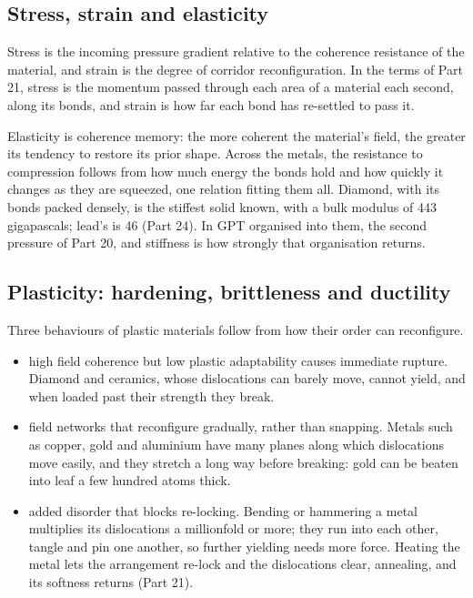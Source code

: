 \subsection{Stress, strain and elasticity}

 Stress is the incoming pressure gradient relative to the coherence resistance of the material, and strain is the degree of corridor reconfiguration. In the terms of Part 21, stress is the momentum passed through each area of a material each second, along its bonds, and strain is how far each bond has re-settled to pass it.

Elasticity is coherence memory: the more coherent the material's field, the greater its tendency to restore its prior shape.  Across the metals, the resistance to compression follows from how much energy the bonds hold and how quickly it changes as they are squeezed, one relation fitting them all. Diamond, with its bonds packed densely, is the stiffest solid known, with a bulk modulus of 443 gigapascals; lead's is 46 (Part 24). In GPT  organised into them, the second pressure of Part 20, and stiffness is how strongly that organisation returns.

\subsection{Plasticity: hardening, brittleness and ductility}

Three behaviours of plastic materials follow from how their order can reconfigure.
\begin{itemize}
\item {} high field coherence but low plastic adaptability causes immediate rupture. Diamond and ceramics, whose dislocations can barely move, cannot yield, and when loaded past their strength they break.
\item {} field networks that reconfigure gradually, rather than snapping. Metals such as copper, gold and aluminium have many planes along which dislocations move easily, and they stretch a long way before breaking: gold can be beaten into leaf a few hundred atoms thick.
\item {} added disorder that blocks re-locking. Bending or hammering a metal multiplies its dislocations a millionfold or more; they run into each other, tangle and pin one another, so further yielding needs more force. Heating the metal lets the arrangement re-lock and the dislocations clear, annealing, and its softness returns (Part 21).
\end{itemize}

